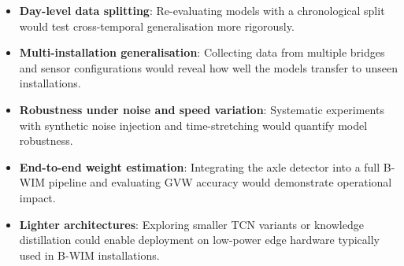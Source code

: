 \begin{itemize}
    \item \textbf{Day-level data splitting}: Re-evaluating models with a
          chronological split would test cross-temporal generalisation more
          rigorously.
    \item \textbf{Multi-installation generalisation}: Collecting data from
          multiple bridges and sensor configurations would reveal how well the
          models transfer to unseen installations.
    \item \textbf{Robustness under noise and speed variation}: Systematic
          experiments with synthetic noise injection and time-stretching would
          quantify model robustness.
    \item \textbf{End-to-end weight estimation}: Integrating the axle detector
          into a full B-WIM pipeline and evaluating GVW accuracy would demonstrate
          operational impact.
    \item \textbf{Lighter architectures}: Exploring smaller TCN variants or
          knowledge distillation could enable deployment on low-power edge
          hardware typically used in B-WIM installations.
\end{itemize}
